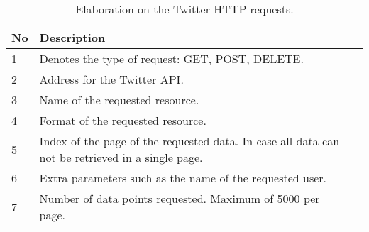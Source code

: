 
\begin{table}[H] 
\begin{centering}
\begin{tabular}{|l|p{9cm}|l|}
\hline
\textbf{No}&	\textbf{Description}										\\\hline
1			&	Denotes the type of request: GET, POST, DELETE.				\\\hline
2			&	Address for the Twitter \ac{API}.							\\\hline
3			&	Name of the requested resource.	   							\\\hline
4			&	Format of the requested resource.							\\\hline
5			&	Index of the page of the requested data. In case all data can not be
retrieved in a single page.													\\\hline 
6			&	Extra parameters such as the name of the requested user.	\\\hline
7			&	Number of data points requested. Maximum of 5000 per page.	\\\hline
\end{tabular}
\caption{Elaboration on the Twitter HTTP requests.}
\label{httpElaboration}
\end{centering}
\end{table}
